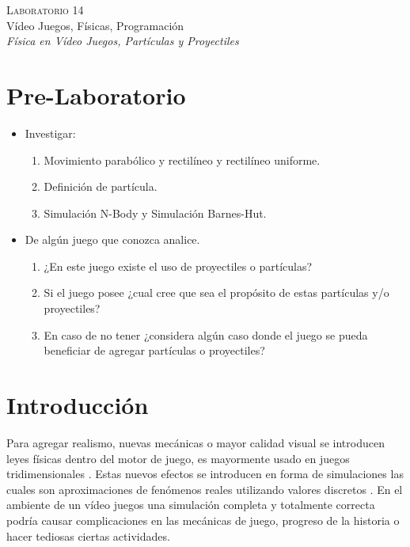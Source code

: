 \begin{center}
\textsc{\Large Laboratorio 14}~\\
{\large Vídeo Juegos, Físicas, Programación}~\\
\emph{Física en Vídeo Juegos, Partículas y Proyectiles}
\end{center}

\section{Pre-Laboratorio}
\begin{itemize}
\item Investigar:
\begin{enumerate}
  \item Movimiento parabólico y rectilíneo y rectilíneo uniforme.
  \item Definición de partícula.
  \item Simulación N-Body y Simulación Barnes-Hut.
\end{enumerate}
\item De algún juego que conozca analice.
\begin{enumerate}
  \item ¿En este juego existe el uso de proyectiles o partículas? 
  \item Si el juego posee ¿cual cree que sea el propósito de estas partículas y/o proyectiles?
  \item En caso de no tener ¿considera algún caso donde el juego se pueda beneficiar de agregar partículas o proyectiles?
\end{enumerate}
\end{itemize}

\section{Introducción}
Para agregar realismo, nuevas mecánicas o mayor calidad visual se introducen leyes físicas dentro del motor de juego, es mayormente usado en juegos tridimensionales \cite[p.~325]{jenkinscreatinggames}. Estas nuevos efectos se introducen en forma de simulaciones las cuales son aproximaciones de fenómenos reales utilizando valores discretos \cite{ian_gamephysics}. En el ambiente de un vídeo juegos una simulación completa y totalmente correcta podría causar complicaciones en las mecánicas de juego, progreso de la historia o hacer tediosas ciertas actividades.

